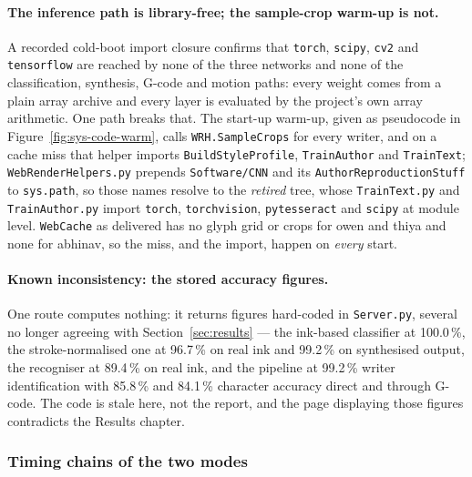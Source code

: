 \paragraph{The inference path is library-free; the sample-crop warm-up is not.}
A recorded cold-boot import closure confirms that \texttt{torch}, \texttt{scipy}, \texttt{cv2} and \texttt{tensorflow} are reached by none of the three networks and none of the classification, synthesis, G-code and motion paths: every weight comes from a plain array archive and every layer is evaluated by the project's own array arithmetic. One path breaks that. The start-up warm-up, given as pseudocode in Figure~\ref{fig:sys-code-warm}, calls \texttt{WRH.SampleCrops} for every writer, and on a cache miss that helper imports \texttt{BuildStyleProfile}, \texttt{TrainAuthor} and \texttt{TrainText}; \texttt{WebRenderHelpers.py} prepends \texttt{Software/CNN} and its \texttt{AuthorReproductionStuff} to \texttt{sys.path}, so those names resolve to the \emph{retired} tree, whose \texttt{TrainText.py} and \texttt{TrainAuthor.py} import \texttt{torch}, \texttt{torchvision}, \texttt{pytesseract} and \texttt{scipy} at module level. \texttt{WebCache} as delivered has no glyph grid or crops for owen and thiya and none for abhinav, so the miss, and the import, happen on \emph{every} start. 


\paragraph{Known inconsistency: the stored accuracy figures.}
One route computes nothing: it returns figures hard-coded in \texttt{Server.py}, several no longer agreeing with Section~\ref{sec:results} --- the ink-based classifier at 100.0\,\%, the stroke-normalised one at 96.7\,\% on real ink and 99.2\,\% on synthesised output, the recogniser at 89.4\,\% on real ink, and the pipeline at 99.2\,\% writer identification with 85.8\,\% and 84.1\,\% character accuracy direct and through G-code. The code is stale here, not the report, and the page displaying those figures contradicts the Results chapter. 

\subsubsection{Timing chains of the two modes}

